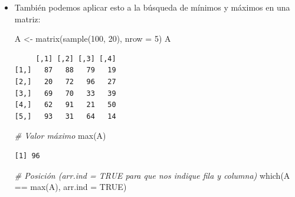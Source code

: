 \documentclass[
]{book}
\newenvironment{Shaded}{\begin{snugshade}}{\end{snugshade}}
\newcommand{\AttributeTok}[1]{\textcolor[rgb]{0.77,0.63,0.00}{#1}}
\newcommand{\CommentTok}[1]{\textcolor[rgb]{0.56,0.35,0.01}{\textit{#1}}}
\newcommand{\ConstantTok}[1]{\textcolor[rgb]{0.00,0.00,0.00}{#1}}
\newcommand{\DecValTok}[1]{\textcolor[rgb]{0.00,0.00,0.81}{#1}}
\newcommand{\FunctionTok}[1]{\textcolor[rgb]{0.00,0.00,0.00}{#1}}
\newcommand{\NormalTok}[1]{#1}
\newcommand{\OtherTok}[1]{\textcolor[rgb]{0.56,0.35,0.01}{#1}}
\newcommand{\SpecialCharTok}[1]{\textcolor[rgb]{0.00,0.00,0.00}{#1}}
\begin{document}
\begin{itemize}
\begin{verbatim}
[1] 2
\end{verbatim}

\begin{Shaded}
\begin{Highlighting}[]
\CommentTok{\# Pero podemos obtener todas las posiciones así:}
\FunctionTok{which}\NormalTok{(w }\SpecialCharTok{==} \FunctionTok{max}\NormalTok{(w))}
\end{Highlighting}
\end{Shaded}

\begin{verbatim}
[1] 2 5
\end{verbatim}
\item
  También podemos aplicar esto a la búsqueda de mínimos y máximos en una matriz:

\begin{Shaded}
\begin{Highlighting}[]
\NormalTok{A }\OtherTok{\textless{}{-}} \FunctionTok{matrix}\NormalTok{(}\FunctionTok{sample}\NormalTok{(}\DecValTok{100}\NormalTok{, }\DecValTok{20}\NormalTok{), }\AttributeTok{nrow =} \DecValTok{5}\NormalTok{)}
\NormalTok{A}
\end{Highlighting}
\end{Shaded}

\begin{verbatim}
     [,1] [,2] [,3] [,4]
[1,]   87   88   79   19
[2,]   20   72   96   27
[3,]   69   70   33   39
[4,]   62   91   21   50
[5,]   93   31   64   14
\end{verbatim}

\begin{Shaded}
\begin{Highlighting}[]
\CommentTok{\# Valor máximo}
\FunctionTok{max}\NormalTok{(A)}
\end{Highlighting}
\end{Shaded}

\begin{verbatim}
[1] 96
\end{verbatim}

\begin{Shaded}
\begin{Highlighting}[]
\CommentTok{\# Posición (arr.ind = TRUE para que nos indique fila y columna)}
\FunctionTok{which}\NormalTok{(A }\SpecialCharTok{==} \FunctionTok{max}\NormalTok{(A), }\AttributeTok{arr.ind =} \ConstantTok{TRUE}\NormalTok{)}
\end{Highlighting}
\end{Shaded}


\end{itemize}
\end{document}
